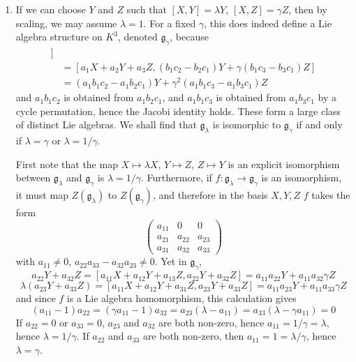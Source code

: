 \begin{enumerate}
    \item If we can choose $Y$ and $Z$ such that $[X,Y] = \lambda Y$, $[X,Z] = \gamma Z$, then by scaling, we may assume $\lambda = 1$. For a fixed $\gamma$, this does indeed define a Lie algebra structure on $K^3$, denoted $\mathfrak{g}_\gamma$, because
    \begin{align*}
        [a_1X + a_2Y& + a_3Z, [b_1X + b_2Y + b_3Z, c_1X + c_2Y + c_3Z]]\\
        &= [a_1X + a_2Y + a_3Z, (b_1c_2 - b_2c_1) Y + \gamma (b_1 c_3 - b_3c_1) Z]\\
        &= (a_1b_1c_2 - a_1 b_2c_1) Y + \gamma^2 (a_1 b_1c_3 - a_1 b_3 c_1) Z
    \end{align*}
    and $a_1b_1c_2$ is obtained from $a_1b_2c_1$, and $a_1b_1c_3$ is obtained from $a_1b_3c_1$ by a cycle permutation, hence the Jacobi identity holds. These form a large class of distinct Lie algebras. We shall find that $\mathfrak{g}_\lambda$ is isomorphic to $\mathfrak{g}_\gamma$ if and only if $\lambda = \gamma$ or $\lambda = 1/\gamma$.

    First note that the map $X \mapsto \lambda X$, $Y \mapsto Z$, $Z \mapsto Y$ is an explicit isomorphism between $\mathfrak{g}_\lambda$ and $\mathfrak{g}_\gamma$ is $\lambda = 1/\gamma$. Furthermore, if $f: \mathfrak{g}_\lambda \to \mathfrak{g}_\gamma$ is an isomorphism, it must map $Z(\mathfrak{g}_\lambda)$ to $Z(\mathfrak{g}_\gamma)$, and therefore in the basis $X,Y,Z$ $f$ takes the form
    \[ \begin{pmatrix} a_{11} & 0 & 0 \\ a_{21} & a_{22} & a_{23} \\ a_{31} & a_{32} & a_{33} \end{pmatrix} \]
    with $a_{11} \neq 0$, $a_{22} a_{33} - a_{32} a_{23} \neq 0$. Yet in $\mathfrak{g}_\gamma$,
    \[ a_{22}Y + a_{32}Z = [a_{11}X + a_{12}Y + a_{13}Z, a_{22}Y + a_{32}Z] = a_{11}a_{22}Y + a_{11}a_{32} \gamma Z \]
    \[ \lambda (a_{23}Y + a_{33}Z) = [a_{11}X + a_{12}Y + a_{31}Z, a_{23}Y + a_{33}Z] = a_{11}a_{23}Y + a_{11}a_{33} \gamma Z \]
    and since $f$ is a Lie algebra homomorphism, this calculation gives
    \[ (a_{11} - 1)a_{22} = (\gamma a_{11} - 1) a_{32} = a_{23}(\lambda - a_{11}) = a_{33}(\lambda - \gamma a_{11}) = 0 \]
    If $a_{22} = 0$ or $a_{33} = 0$, $a_{23}$ and $a_{32}$ are both non-zero, hence $a_{11} = 1/\gamma = \lambda$, hence $\lambda = 1/\gamma$. If $a_{22}$ and $a_{33}$ are both non-zero, then $a_{11} = 1 = \lambda/\gamma$, hence $\lambda = \gamma$.


\end{enumerate}
